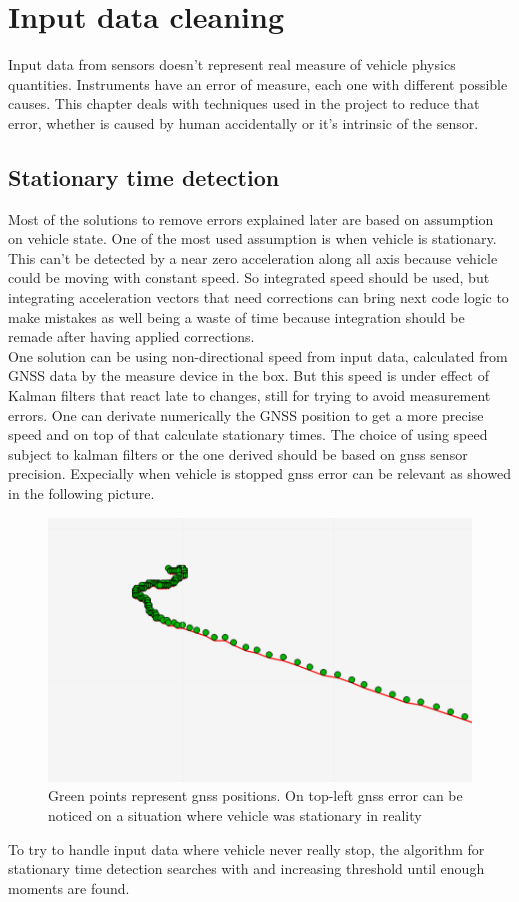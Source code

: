 \chapter{Input data cleaning}
\label{chap:input_data_cleaning}

Input data from sensors doesn't represent real measure of vehicle physics quantities. Instruments have an error of measure, each one with different possible causes. This chapter deals with techniques used in the project to reduce that error, whether is caused by human accidentally or it's intrinsic of the sensor.

\section{Stationary time detection}
Most of the solutions to remove errors explained later are based on assumption on vehicle state. One of the most used assumption is when vehicle is stationary. \\
This can't be detected by a near zero acceleration along all axis because vehicle could be moving with constant speed. So integrated speed should be used, but integrating acceleration vectors that need corrections can bring next code logic to make mistakes as well being a waste of time because integration should be remade after having applied corrections. \\
One solution can be using non-directional speed from input data, calculated from GNSS data by the measure device in the box. But this speed is under effect of Kalman filters that react late to changes, still for trying to avoid measurement errors. One can derivate numerically the GNSS position to get a more precise speed and on top of that calculate stationary times. The choice of using speed subject to kalman filters or the one derived should be based on gnss sensor precision. Expecially when vehicle is stopped gnss error can be relevant as showed in the following picture.
\begin{figure}[H]
\includegraphics[width=\textwidth]{gnss_error_stationary_vehicle}
\caption{Green points represent gnss positions. On top-left gnss error can be noticed on a situation where vehicle was stationary in reality}
\end{figure}
To try to handle input data where vehicle never really stop, the algorithm for stationary time detection searches with and increasing threshold until enough moments are found.

